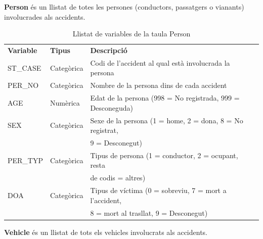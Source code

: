 \documentclass[12pt,longbibliography]{article}
\theoremstyle{definition}
\theoremstyle{remark}
\begin{document}
\textbf{Person} és un llistat de totes les persones (conductors, passatgers o vianants) involucrades als accidents.

\begin{table}[H]
\centering
\begin{tabular}{|l|l|l|}
\hline
\textbf{Variable} & \textbf{Tipus} & \textbf{Descripció}                                                       \\
ST\_CASE           & Categòrica     & Codi de l’accident al qual està involucrada la persona                    \\
PER\_NO             & Categòrica     & Nombre de la persona dins de cada accident                                \\
AGE                   & Numèrica       & Edat de la persona (998 = No registrada, 999 = Desconeguda)               \\
SEX                   & Categòrica     & Sexe de la persona (1 = home, 2 = dona, 8 = No registrat,  \\
                          &                        &  9 = Desconegut) \\
PER\_TYP           & Categòrica     & Tipus de persona (1 = conductor, 2 = ocupant, resta    \\
                          &                        &  de codis = altres)    \\
DOA                   & Categòrica      & Tipus de víctima (0 = sobreviu, 7 = mort a l’accident, \\
                          &                         & 8 = mort al trasllat, 9 = Desconegut) \\ \hline
\end{tabular}
\caption{\label{persones-table}Llistat de variables de la taula Person}
\end{table}


\textbf{Vehicle} és un llistat de tots els vehicles involucrats als accidents.
\end{document}
